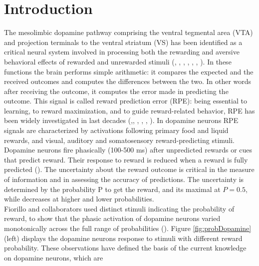 \chapter{Introduction}
\label{chap:Introduction}
The mesolimbic dopamine pathway comprising the ventral tegmental area (VTA) and projection terminals to the ventral striatum (VS) has been identified as a critical neural system involved in processing both the rewarding and aversive behavioral effects of rewarded and unrewarded stimuli (\cite{Schultz1992}, \cite{Montague}, \cite{Ungless2004}, \cite{Sun2014}, \cite{Tobler2003}, \cite{UchidaDop1}, \cite{Takahashi2016}). In these functions the brain performs simple arithmetic: it compares the expected and the received outcomes and computes the differences between the two. In other words after receiving the outcome, it computes the error made in predicting the outcome. This signal is called reward prediction  error (RPE): being essential to learning, to reward maximization, and to guide reward-related behavior, RPE has been widely investigated in last decades (\cite{Schultz1997},, \cite{UchidaDop}, \cite{Fiorillo}, \cite{Pagnoni}, \cite{Schultz2016}). In dopamine neurons RPE signals are characterized by activations following primary food and liquid rewards, and visual, auditory and somatosensory reward-predicting stimuli. Dopamine neurons fire phasically (100-500 ms) after unpredicted rewards or cues that predict reward. Their response to reward is reduced when a reward is fully predicted (\cite{Uchida}). The uncertainty about the reward outcome is critical in the measure of information and in assessing the accuracy of predictions. The uncertainty is determined by the probability P to get the reward, and its maximal at $P=0.5$, while decreases at higher and lower probabilities.\\Fiorillo and collaborators used distinct stimuli indicating the probability of reward, to show that the phasic activation of dopamine neurons varied monotonically across the full range of probabilities (\cite{Fiorillo}). Figure \ref{fig:probDopamine} (left) displays the dopamine neurons response to stimuli with different reward probability. These observations have defined the basis of the current knowledge on dopamine neurons, which are 